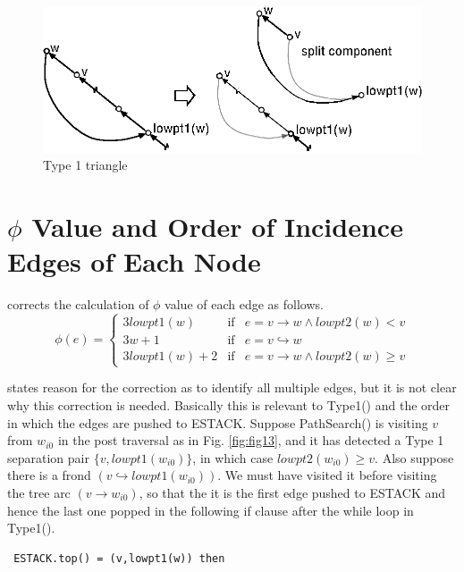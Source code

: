 \documentclass[twoside,twocolumn]{article}
\begin{document}
\begin{figure}[!htb]
\centering
\includegraphics[scale=0.8]{spqr_fig12.eps}
\caption{Type 1 triangle}
\label{fig:fig12}
\end{figure}

\section{$\phi$ Value and Order of Incidence Edges of Each Node}

\cite{GM01} corrects the calculation of $\phi$ value of each edge as follows.
\[
\phi(e) = \left\{ \begin{array}{lcl}
3lowpt1(w) & \mbox{if} & e = v \rightarrow w \wedge lowpt2(w) < v \\
3w + 1 & \mbox{if} & e = v \hookrightarrow w \\
3lowpt1(w) + 2 & \mbox{if} & e = v \rightarrow w \wedge lowpt2(w) \geq v
\end{array}\right.
\]

\cite{GM01} states reason for the correction as to identify all multiple edges,
but it is not clear why this correction is needed. Basically this is relevant
to {\ttfamily Type1()} and the order in which the edges are pushed to
{\ttfamily ESTACK}. Suppose {\ttfamily PathSearch()} is visiting $v$ from $w_{i0}$ in the post traversal as in Fig. \ref{fig:fig13}, and it
has detected a Type 1 separation pair $\{ v, lowpt1(w_{i0})\}$, in which case
$lowpt2(w_{i0}) \geq v$. Also suppose there is a frond $(v \hookrightarrow lowpt1(w_{i0}))$.
We must have visited it before visiting the tree arc $(v \rightarrow w_{i0})$, so that the it
is the first edge pushed to {\ttfamily ESTACK} and hence the last one popped in the following if clause after the while loop
 in {\ttfamily Type1()}.
\begin{ttfamily}
\begin{lstlisting}
 ESTACK.top() = (v,lowpt1(w)) then
\end{lstlisting}
\end{ttfamily}
\end{document}
